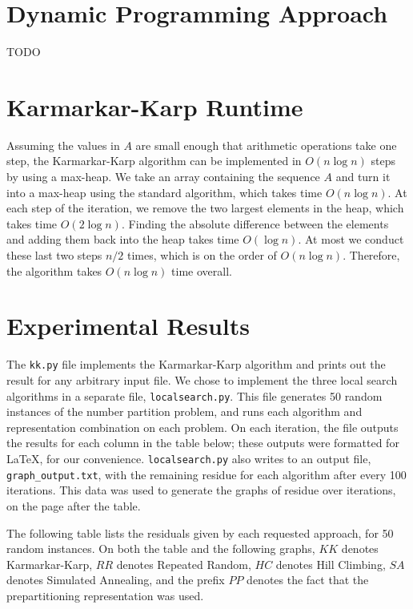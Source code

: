 \documentclass[solution, letterpaper]{cs121}
\begin{document}

\section*{Dynamic Programming Approach}
TODO


\section*{Karmarkar-Karp Runtime}
\hspace{4mm} Assuming the values in $A$ are small enough that arithmetic operations take one step, the Karmarkar-Karp algorithm can be implemented in $O(n \log{n})$ steps by using a max-heap. We take an array containing the sequence $A$ and turn it into a max-heap using the standard algorithm, which takes time $O(n \log{n})$. At each step of the iteration, we remove the two largest elements in the heap, which takes time $O(2 \log{n})$. Finding the absolute difference between the elements and adding them back into the heap takes time $O(\log{n})$. At most we conduct these last two steps $n/2$ times, which is on the order of $O(n \log{n})$. Therefore, the algorithm takes $O(n \log{n})$ time overall.

\section*{Experimental Results}
\hspace{4mm} The \texttt{kk.py} file implements the Karmarkar-Karp algorithm and prints out the result for any arbitrary input file. We chose to implement the three local search algorithms in a separate file, \texttt{localsearch.py}. This file generates 50 random instances of the number partition problem, and runs each algorithm and representation combination on each problem. On each iteration, the file outputs the results for each column in the table below; these outputs were formatted for \LaTeX, for our convenience. \texttt{localsearch.py} also writes to an output file, \texttt{graph\_output.txt}, with the remaining residue for each algorithm after every 100 iterations. This data was used to generate the graphs of residue over iterations, on the page after the table.

The following table lists the residuals given by each requested approach, for 50 random instances. On both the table and the following graphs, $KK$ denotes Karmarkar-Karp, $RR$ denotes Repeated Random, $HC$ denotes Hill Climbing, $SA$ denotes Simulated Annealing, and the prefix $PP$ denotes the fact that the prepartitioning representation was used.
\end{document}
